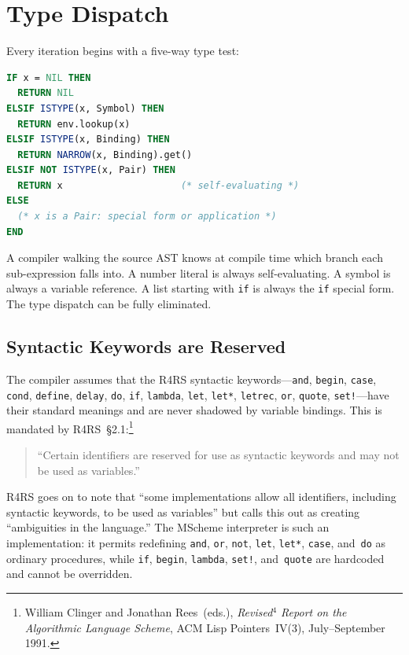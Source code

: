 \documentclass[12pt]{report}
\begin{document}
\section{Type Dispatch}
\label{sec:typedispatch}

Every iteration begins with a five-way type test:

\begin{lstlisting}[language=Modula3]
IF x = NIL THEN
  RETURN NIL
ELSIF ISTYPE(x, Symbol) THEN
  RETURN env.lookup(x)
ELSIF ISTYPE(x, Binding) THEN
  RETURN NARROW(x, Binding).get()
ELSIF NOT ISTYPE(x, Pair) THEN
  RETURN x                     (* self-evaluating *)
ELSE
  (* x is a Pair: special form or application *)
END
\end{lstlisting}

A compiler walking the source AST knows at compile time which branch
each sub-expression falls into.  A number literal is always
self-evaluating.  A symbol is always a variable reference.  A list
starting with \texttt{if} is always the \texttt{if} special form.
The type dispatch can be fully eliminated.

\subsection{Syntactic Keywords are Reserved}
\label{sec:keywords-reserved}

The compiler assumes that the R4RS syntactic keywords---\texttt{and},
\texttt{begin}, \texttt{case}, \texttt{cond}, \texttt{define},
\texttt{delay}, \texttt{do}, \texttt{if}, \texttt{lambda},
\texttt{let}, \texttt{let*}, \texttt{letrec}, \texttt{or},
\texttt{quote}, \texttt{set!}---have their standard meanings and are
never shadowed by variable bindings.  This is mandated by
R4RS~\S2.1:\footnote{William Clinger and Jonathan Rees~(eds.),
\emph{Revised$^4$ Report on the Algorithmic Language Scheme},
ACM Lisp Pointers~IV(3), July--September 1991.}

\begin{quote}
``Certain identifiers are reserved for use as syntactic keywords
and may not be used as variables.''
\end{quote}

R4RS goes on to note that ``some implementations allow all
identifiers, including syntactic keywords, to be used as variables''
but calls this out as creating ``ambiguities in the language.''
The MScheme interpreter is such an implementation: it permits
redefining \texttt{and}, \texttt{or}, \texttt{not}, \texttt{let},
\texttt{let*}, \texttt{case}, and~\texttt{do} as ordinary
procedures, while \texttt{if}, \texttt{begin}, \texttt{lambda},
\texttt{set!}, and~\texttt{quote} are hardcoded and cannot be
overridden.
\end{document}
